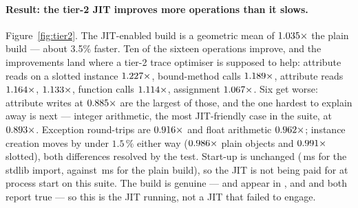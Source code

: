 \paragraph{Result: the tier-2 JIT improves more operations than it slows.}
Figure~\ref{fig:tier2}. The JIT-enabled build is a geometric mean of
$\meas{geomean:b5_buildcfg-plain|b5_buildcfg-jit}{1.035}\times$ the plain build --- about 3.5\% faster. Ten of the sixteen operations improve, and
the improvements land where a tier-2 trace optimiser is supposed to help: attribute reads on a
slotted instance $\meas{ratio:b5_buildcfg-plain:attr_get_slots/plain|b5_buildcfg-jit:attr_get_slots/jit}{1.227}\times$, bound-method calls $\meas{ratio:b5_buildcfg-plain:method_call/plain|b5_buildcfg-jit:method_call/jit}{1.189}\times$, attribute reads
$\meas{ratio:b5_buildcfg-plain:attr_get/plain|b5_buildcfg-jit:attr_get/jit}{1.164}\times$,  $\meas{ratio:b5_buildcfg-plain:list_append/plain|b5_buildcfg-jit:list_append/jit}{1.133}\times$, function calls $\meas{ratio:b5_buildcfg-plain:func_call/plain|b5_buildcfg-jit:func_call/jit}{1.114}\times$, 
assignment $\meas{ratio:b5_buildcfg-plain:dict_setitem/plain|b5_buildcfg-jit:dict_setitem/jit}{1.067}\times$. Six get worse: attribute writes at $\meas{ratio:b5_buildcfg-plain:attr_set/plain|b5_buildcfg-jit:attr_set/jit}{0.885}\times$ are the
largest of those, and the one hardest to explain away is next --- integer arithmetic, the most
JIT-friendly case in the suite, at $\meas{ratio:b5_buildcfg-plain:int_arith/plain|b5_buildcfg-jit:int_arith/jit}{0.893}\times$. Exception round-trips are $\meas{ratio:b5_buildcfg-plain:exception_roundtrip/plain|b5_buildcfg-jit:exception_roundtrip/jit}{0.916}\times$ and
float arithmetic $\meas{ratio:b5_buildcfg-plain:float_arith/plain|b5_buildcfg-jit:float_arith/jit}{0.962}\times$; instance creation moves by under $1.5\,\%$ either way
($\meas{ratio:b5_buildcfg-plain:create_plain_obj/plain|b5_buildcfg-jit:create_plain_obj/jit}{0.986}\times$ plain objects and $\meas{ratio:b5_buildcfg-plain:create_slots_obj/plain|b5_buildcfg-jit:create_slots_obj/jit}{0.991}\times$ slotted), both differences resolved by the test. Start-up is unchanged (\,ms for the
stdlib import, against \,ms for the plain build), so the JIT is not being paid for at
process start on this suite. The build is genuine ---  and 
appear in , and  and
 both report true --- so this is the JIT running, not a JIT that
failed to engage.

